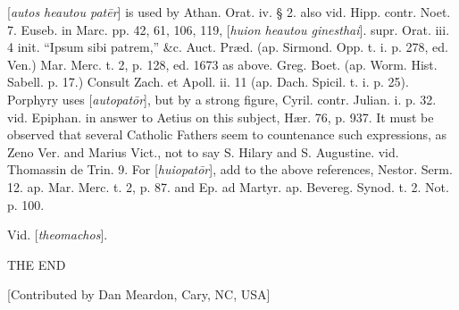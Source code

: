 [\emph{autos heautou pat\={e}r}] is used by
Athan. Orat. iv. § 2. also vid. Hipp. contr. Noet. 7. Euseb. in Marc.
pp. 42, 61, 106, 119, [\emph{huion heautou ginesthai}]. supr. Orat.
iii. 4 init. ``Ipsum sibi patrem,'' \&c. Auct. Præd. (ap. Sirmond.
Opp. t. i. p. 278, ed. Ven.) Mar. Merc. t. 2, p. 128, ed. 1673 as
above. Greg. Boet. (ap. Worm. Hist. Sabell. p. 17.) Consult Zach.
et Apoll. ii. 11 (ap. Dach. Spicil. t. i. p. 25). Porphyry uses
[\emph{autopat\={o}r}], but by a strong figure, Cyril. contr.
Julian. i. p. 32. vid. Epiphan. in answer to Aetius on this subject, Hær.
76, p. 937. It must be observed that several Catholic Fathers seem to
countenance such expressions, as Zeno Ver. and Marius Vict., not to
say S. Hilary and S. Augustine. vid. Thomassin de Trin. 9. For [\emph{huiopat\={o}r}],
add to the above references, Nestor. Serm. 12. ap. Mar. Merc. t. 2, p.
87. and Ep. ad Martyr. ap. Bevereg. Synod. t. 2. Not. p. 100.

\xsection{[Christomachos]}

Vid. [\emph{theomachos}].

THE END

[Contributed by Dan Meardon, Cary, NC, USA]
